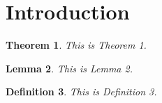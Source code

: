 \documentclass{article}
\newtheorem{theorem}{Theorem}
\newtheorem{lemma}[theorem]{Lemma}
\newtheorem{definition}[theorem]{Definition} %
\begin{document}
\section{Introduction}

\begin{theorem}
This is Theorem 1.
\end{theorem}

\begin{lemma}
This is Lemma 2.
\end{lemma}

\begin{definition}
This is Definition 3.
\end{definition}
\end{document}
